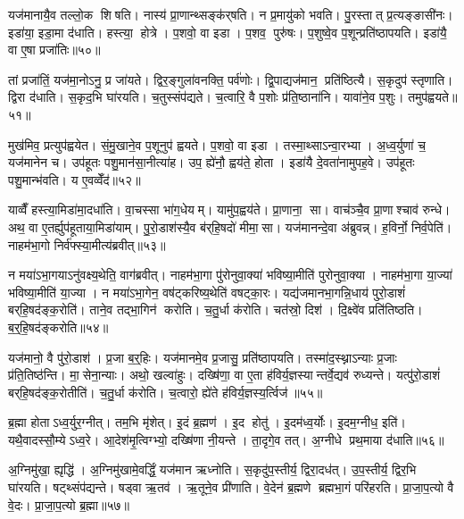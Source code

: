 यज॑मानायै॒व तल्लो॒क शिषति। नास्य॑ प्रा॒णान्थ्सङ्क॑र्‌षति। न प्र॒मायु॑को भवति। पु॒रस्तात् प्र॒त्यङ्ङासी॑नः। इडा॑या॒ इडा॒मा द॑धाति। हस्त्या॒ होत्रे। प॒शवो॒ वा इडा। प॒शव॒ पुरु॑षः। प॒शुष्वे॒व प॒शून्प्रति॑ष्ठापयति। इडा॑यै॒ वा ए॒षा प्रजा॑तिः॥५०॥

तां प्रजा॑तिं॒ यज॑मा॒नोऽनु॒ प्र जा॑यते। द्विर॒ङ्गुला॑वनक्ति॒ पर्व॑णोः। द्वि॒पाद्यज॑मान॒ प्रति॑ष्ठित्यै। स॒कृदुप॑ स्तृणाति। द्विरा द॑धाति। स॒कृद॒भि घा॑रयति। च॒तुस्संप॑द्यते। च॒त्वारि॒ वै प॒शोः प्र॑ति॒ष्ठाना॑नि। यावा॑ने॒व प॒शुः। तमुप॑ह्वयते॥५१॥

मुख॑मिव॒ प्रत्युप॑ह्वयेत। सं॒मु॒खाने॒व प॒शूनुप॑ ह्वयते। प॒शवो॒ वा इडा। तस्मा॒थ्साऽन्वा॒रभ्या। अ॒ध्व॒र्युणा॑ च॒ यज॑मानेन च। उप॑हूतः पशु॒मान॑सा॒नीत्या॑ह। उप॒ ह्ये॑नौ॒ ह्वय॑ते॒ होता। इडा॑यै दे॒वता॑नामुपह॒वे। उप॑हूतः पशु॒मान्भ॑वति। य ए॒वव्वेँद॑॥५२॥

याव्वैँ हस्त्या॒मिडा॑मा॒दधा॑ति। वा॒चस्सा भा॑ग॒धेयम्। यामु॑प॒ह्वय॑ते। प्रा॒णाना॒ सा। वाच॑ञ्चै॒व प्रा॒णाश्चाव॑ रुन्धे। अथ॒ वा ए॒तर्ह्युप॑हूताया॒मिडा॑याम्। पु॒रो॒डाश॑स्यै॒व ब॑र्‌हि॒षदो॑ मीमा॒सा। यज॑मानन्दे॒वा अ॑ब्रुवन्न्। ह॒विर्नो॒ निर्व॒पेति॑। नाहम॑भा॒गो निर्व॑फ्स्या॒मीत्य॑ब्रवीत्॥५३॥

न मया॑ऽभा॒गयाऽनु॑वक्ष्य॒थेति॒ वाग॑ब्रवीत्। नाहम॑भा॒गा पु॑रोनुवा॒क्या॑ भविष्या॒मीति॑ पुरोनुवा॒क्या। नाहम॑भा॒गा या॒ज्या॑ भविष्या॒मीति॑ या॒ज्या। न मया॑ऽभा॒गेन॒ वष॑ट्करिष्य॒थेति॑ वषट्का॒रः। यद्य॑जमानभा॒गन्नि॒धाय॑ पुरो॒डाशं॑ बर्‌हि॒षद॑ङ्क॒रोति॑। ताने॒व तद्भा॒गिन॑ करोति। च॒तु॒र्धा क॑रोति। चत॑स्रो॒ दिश॑। दि॒क्ष्वे॑व प्रति॑तिष्ठति। ब॒र्॒हि॒षद॑ङ्करोति॥५४॥

यज॑मानो॒ वै पु॑रो॒डाश॑। प्र॒जा ब॒र्॒हिः। यज॑मानमे॒व प्र॒जासु॒ प्रति॑ष्ठापयति। तस्मा॑द॒स्थ्नाऽन्याः प्र॒जाः प्र॑ति॒तिष्ठ॑न्ति। मा॒सेना॒न्याः। अथो॒ खल्वा॑हुः। दख्षि॑णा॒ वा ए॒ता ह॑विर्य॒ज्ञस्यान्तर्वे॒द्यव॑ रुध्यन्ते। यत्पु॑रो॒डाशं॑ बर्‌हि॒षद॑ङ्क॒रोतीति॑। च॒तु॒र्धा क॑रोति। च॒त्वारो॒ ह्ये॑ते ह॑विर्य॒ज्ञस्य॒र्त्विज॑॥५५॥

ब्र॒ह्मा होताऽध्व॒र्युर॒ग्नीत्। तम॒भि मृ॑शेत्। इ॒दं ब्र॒ह्मण॑। इ॒द होतु॑। इ॒दम॑ध्व॒र्योः। इ॒दम॒ग्नीध॒ इति॑। यथै॒वादस्सौ॒म्येऽध्व॒रे। आ॒देश॑मृ॒त्विग्भ्यो॒ दख्षि॑णा नी॒यन्ते। ता॒दृगे॒व तत्। अ॒ग्नीधे प्रथ॒माया द॑धाति॥५६॥

अ॒ग्निमु॑खा॒ ह्यृद्धि॑। अ॒ग्निमु॑खामे॒वर्द्धिं॒ यज॑मान ऋध्नोति। स॒कृदु॑प॒स्तीर्य॒ द्विरा॒दध॑त्। उ॒प॒स्तीर्य॒ द्विर॒भि घा॑रयति। षट्थ्संप॑द्यन्ते। षड्वा ऋ॒तव॑। ऋ॒तूने॒व प्री॑णाति। वे॒देन॑ ब्र॒ह्मणे ब्रह्मभा॒गं परि॑हरति। प्रा॒जा॒प॒त्यो वै वे॒दः। प्रा॒जा॒प॒त्यो ब्र॒ह्मा॥५७॥

